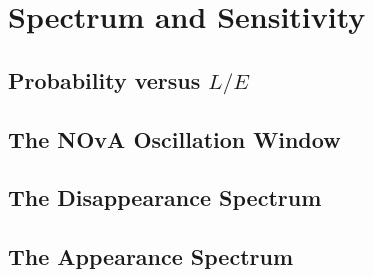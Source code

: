 \section{Spectrum and Sensitivity}
\label{sec:spectrum}
\label{sec:sensitivity}


\subsection{Probability versus $L/E$}

\subsection{The NOvA Oscillation Window}

\subsection{The Disappearance Spectrum}

\subsection{The Appearance Spectrum}
